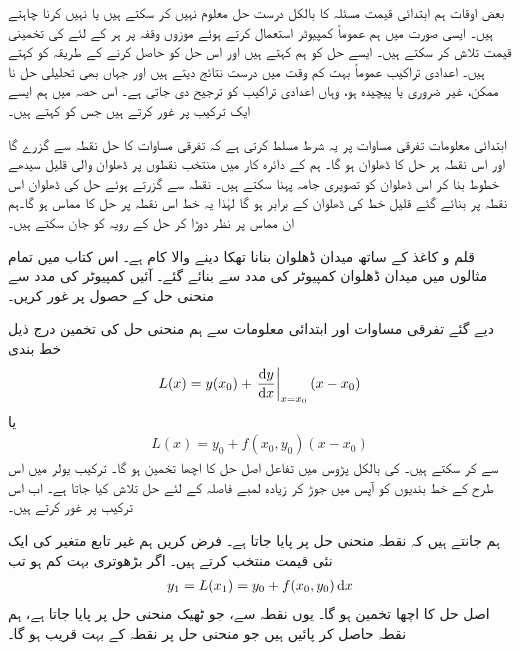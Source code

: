 بعض اوقات ہم ابتدائی قیمت مسئلہ  کا بالکل درست حل معلوم نہیں کر سکتے ہیں یا نہیں کرنا چاہتے ہیں۔ ایسی صورت میں ہم عموماً کمپیوٹر استعمال کرتے ہوئے موزوں وقفہ پر ہر  کے لئے  کی تخمینی قیمت   تلاش کر سکتے ہیں۔ ایسے حل کو ہم  کہتے ہیں اور اس حل کو حاصل کرنے کے طریقہ کو  کہتے ہیں۔ اعدادی تراکیب عموماً بہت کم وقت میں  درست نتائج دیتے ہیں اور جہاں بھی تحلیلی حل نا ممکن، غیر ضروری یا پیچیدہ ہو، وہاں اعدادی تراکیب کو ترجیح دی جاتی ہے۔ اس حصہ میں ہم ایسے ایک ترکیب پر غور کرتے ہیں جس کو  کہتے ہیں۔ 

ابتدائی معلومات  تفرقی مساوات  پر یہ شرط مسلط کرتی ہے کہ تفرقی مساوات کا حل نقطہ   سے گزرے گا اور اس نقطہ ہر حل کا ڈھلوان  ہو گا۔ ہم  کے دائرہ کار میں منتخب نقطوں  پر  ڈھلوان والی قلیل سیدھے خطوط بنا کر اس ڈھلوان کو تصویری جامہ پہنا سکتے ہیں۔ نقطہ  سے گزرتے ہوئے حل کی ڈھلوان اس نقطہ پر بنائے گئے قلیل خط کی ڈھلوان کے برابر ہو گا لہٰذا یہ خط اس نقطہ پر حل کا مماس ہو گا۔ہم ان مماس پر نظر دوڑا کر حل کے رویہ کو جان سکتے ہیں۔

قلم و کاغذ کے ساتھ میدان ڈھلوان بنانا تھکا دینے والا کام ہے۔ اس کتاب میں تمام مثالوں میں میدان ڈھلوان کمپیوٹر کی مدد سے بنائے گئے۔ آئیں  کمپیوٹر کی مدد سے منحنی حل  کے حصول پر غور کریں۔

دیے گئے تفرقی مساوات  اور ابتدائی معلومات  سے ہم منحنی حل  کی تخمین درج ذیل خط بندی
\begin{align*}
L(x)=y(x_0)+\left.\frac{\dif y}{\dif x}\right\vert_{x=x_0} (x-x_0)
\end{align*}
یا
\begin{align*}
L(x)=y_0+f(x_0,y_0)(x-x_0)
\end{align*}
سے  کر سکتے ہیں۔  کی بالکل پڑوس میں تفاعل  اصل حل  کا اچھا تخمین ہو گا۔ ترکیب یولر میں اس طرح کے خط بندیوں کو آپس میں جوڑ کر زیادہ لمبے فاصلہ کے لئے حل تلاش کیا جاتا ہے۔ اب اس ترکیب پر غور کرتے ہیں۔

ہم جانتے ہیں کہ نقطہ  منحنی حل پر پایا جاتا ہے۔ فرض کریں ہم غیر تابع متغیر کی ایک نئی قیمت  منتخب کرتے ہیں۔  اگر بڑھوتری  بہت کم ہو تب
\begin{align*}
y_1=L(x_1)=y_0+f(x_0,y_0)\dif x
\end{align*}
اصل حل  کا اچھا تخمین ہو گا۔ یوں نقطہ  سے، جو ٹھیک منحنی حل پر پایا جاتا ہے، ہم نقطہ  حاصل کر پائیں ہیں جو منحنی حل پر نقطہ  کے بہت قریب ہو گا۔

